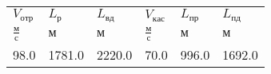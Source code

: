 \begin{tabular}{llllll}
$V_{отр}$ & $L_{р}$ & $L_{вд}$ & $V_{кас}$ & $L_{пр}$ & $L_{пд}$ \\
$\frac{м}{с}$ & $м$ & $м$ & $\frac{м}{с}$ & $м$ & $м$ \\
98.0 & 1781.0 & 2220.0 & 70.0 & 996.0 & 1692.0 \\
\end{tabular}
